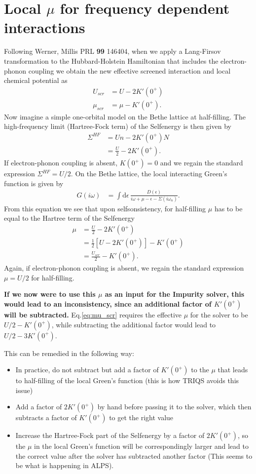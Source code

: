 \documentclass[12pt,a4paper]{scrartcl}
\numberwithin{equation}{section}
\begin{document}
\section{Local $\mu$ for frequency dependent interactions}
Following Werner, Millis PRL \textbf{99} 146404, when we apply a 
Lang-Firsov transformation to the Hubbard-Holstein Hamiltonian
that includes the electron-phonon coupling we obtain the new 
effective screened interaction and local chemical potential
as
\begin{align}
U_{scr}   &=   U - 2K'(0^+) \\
\mu_{scr} &= \mu - K'(0^+). \label{eq:mu_scr}
\end{align}
Now imagine a simple one-orbital model on the Bethe lattice at half-filling. The high-frequency
limit (Hartree-Fock term) of the Selfenergy is then given by
\begin{align}
\Sigma^{HF} &= Un - 2K'(0^+)N \nonumber \\
&= \frac{U}{2} - 2K'(0^+).
\end{align}
If electron-phonon coupling is absent, $K(0^+)=0$ and we regain
the standard expression $\Sigma^{HF} = U/2$.
On the Bethe lattice, the local interacting Green's function is given by
\begin{align}
G(i\omega)
&= \int\mathrm{d}\epsilon \, \frac{D(\epsilon)}{i\omega + \mu - \epsilon - \Sigma(i\omega_n)}.
\end{align}
From this equation we see that upon selfsonsistency, for half-filling $\mu$ has 
to be equal to the Hartree term of the Selfenergy
\begin{align}
\mu &= \frac{U}{2} - 2K'(0^+) \nonumber \\
&= \frac{1}{2} \left[ U - 2K'(0^+) \right] -K'(0^+) \nonumber \\
&= \frac{U_{scr}}{2} -K'(0^+) .
\end{align}
Again, if electron-phonon coupling is absent, we regain
the standard expression $\mu = U/2$ for half-filling. 

\textbf{If we now were to use this $\mu$ as an input for the Impurity solver, this would lead
to an inconsistency, since an additional factor of $K'(0^+)$ will be subtracted.}
Eq.\eqref{eq:mu_scr} requires the effective $\mu$ for the solver to be 
$U/2 - K'(0^+)$, while subtracting the additional factor would lead to 
$U/2 - 3K'(0^+)$.

\bigskip
This can be remedied in the following way:
\begin{itemize}
\item In practice, do not subtract but add a factor of $K'(0^+)$
to the $\mu$ that leads to half-filling of the local Green's function
(this is how TRIQS avoids this issue)
\item Add a factor of $2K'(0^+)$ by hand before passing it to the solver, which then subtracts
a factor of $K'(0^+)$ to get the right value
\item Increase the Hartree-Fock part of the Selfenergy by a factor of $2K'(0^+)$,
so the $\mu$ in the local Green's function will be correspondingly larger and lead to
the correct value after the solver has subtracted another factor
(This seems to be what is happening in ALPS).
\end{itemize}
\end{document}

